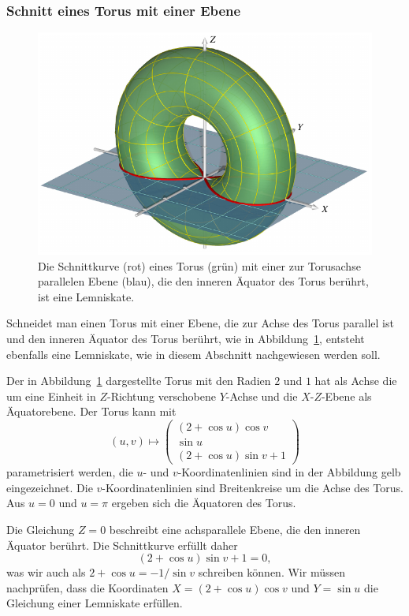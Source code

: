 \subsubsection{Schnitt eines Torus mit einer Ebene}
\begin{figure}
\centering
\includegraphics{chapters/110-elliptisch/images/torusschnitt.pdf}
\caption{Die Schnittkurve (rot) eines Torus (grün)
mit einer zur Torusachse parallelen Ebene (blau),
die den inneren Äquator des Torus berührt, ist eine Lemniskate.
\label{buch:elliptisch:lemniskate:torusschnitt}}
\end{figure}
%
Schneidet man einen Torus mit einer Ebene, die zur Achse des Torus
parallel ist und den inneren Äquator des Torus berührt, wie in
Abbildung~\ref{buch:elliptisch:lemniskate:torusschnitt},
entsteht ebenfalls eine Lemniskate, wie in diesem Abschnitt nachgewiesen
werden soll.

Der in Abbildung~\ref{buch:elliptisch:lemniskate:torusschnitt}
dargestellte Torus mit den Radien $2$ und $1$ hat als Achse die
um eine Einheit in $Z$-Richtung verschobene $Y$-Achse und die
$X$-$Z$-Ebene als Äquatorebene.
Der Torus kann mit
\[
(u,v)
\mapsto
\begin{pmatrix}
(2+\cos u) \cos v    \\
   \sin u            \\
(2+\cos u) \sin v + 1
\end{pmatrix}
\]
parametrisiert werden, die $u$- und $v$-Koordinatenlinien sind 
in der Abbildung gelb eingezeichnet.
Die $v$-Koordinatenlinien sind Breitenkreise um die Achse des Torus.
Aus $u=0$ und $u=\pi$ ergeben sich die Äquatoren des Torus.

Die Gleichung $Z=0$ beschreibt eine achsparallele Ebene, die den
inneren Äquator berührt.
Die Schnittkurve erfüllt daher
\[
(2+\cos u)\sin v + 1 = 0,
\]
was wir auch als $2 +\cos u = -1/\sin v$ schreiben können.
Wir müssen nachprüfen, dass die Koordinaten
$X=(2+\cos u)\cos v$ und $Y=\sin u$ die Gleichung einer Lemniskate
erfüllen.


